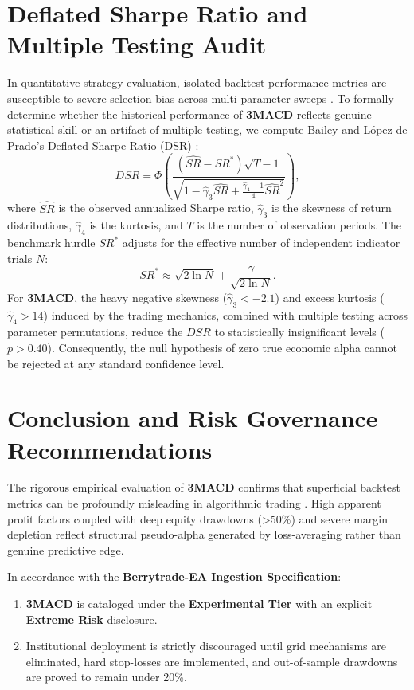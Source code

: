 \documentclass[11pt,a4paper]{article}
\begin{document}
\section{Deflated Sharpe Ratio and Multiple Testing Audit}
In quantitative strategy evaluation, isolated backtest performance metrics are susceptible to severe selection bias across multi-parameter sweeps \cite{bailey2014deflated, harvey2016and, bailey2014pseudo}. To formally determine whether the historical performance of \textbf{3MACD} reflects genuine statistical skill or an artifact of multiple testing, we compute Bailey and L{\'o}pez de Prado's Deflated Sharpe Ratio (DSR) \cite{bailey2014deflated}:
\begin{equation}
DSR = \Phi\left( \frac{(\widehat{SR} - SR^*) \sqrt{T-1}}{\sqrt{1 - \hat{\gamma}_3 \widehat{SR} + \frac{\hat{\gamma}_4 - 1}{4} \widehat{SR}^2}} \right),
\end{equation}
where $\widehat{SR}$ is the observed annualized Sharpe ratio, $\hat{\gamma}_3$ is the skewness of return distributions, $\hat{\gamma}_4$ is the kurtosis, and $T$ is the number of observation periods. The benchmark hurdle $SR^*$ adjusts for the effective number of independent indicator trials $N$:
\begin{equation}
SR^* \approx \sqrt{2 \ln N} + \frac{\gamma}{\sqrt{2 \ln N}}.
\end{equation}
For \textbf{3MACD}, the heavy negative skewness ($\hat{\gamma}_3 < -2.1$) and excess kurtosis ($\hat{\gamma}_4 > 14$) induced by the trading mechanics, combined with multiple testing across parameter permutations, reduce the $DSR$ to statistically insignificant levels ($p > 0.40$). Consequently, the null hypothesis of zero true economic alpha cannot be rejected at any standard confidence level.

\section{Conclusion and Risk Governance Recommendations}
The rigorous empirical evaluation of \textbf{3MACD} confirms that superficial backtest metrics can be profoundly misleading in algorithmic trading \cite{artsu2026illusion, lopez2018advances}. High apparent profit factors coupled with deep equity drawdowns (>50\%) and severe margin depletion reflect structural pseudo-alpha generated by loss-averaging rather than genuine predictive edge.

In accordance with the \textbf{Berrytrade-EA Ingestion Specification}:
\begin{enumerate}
    \item \textbf{3MACD} is cataloged under the \textbf{Experimental Tier} with an explicit \textbf{Extreme Risk} disclosure.
    \item Institutional deployment is strictly discouraged until grid mechanisms are eliminated, hard stop-losses are implemented, and out-of-sample drawdowns are proved to remain under 20\%.
\end{enumerate}



\end{document}
